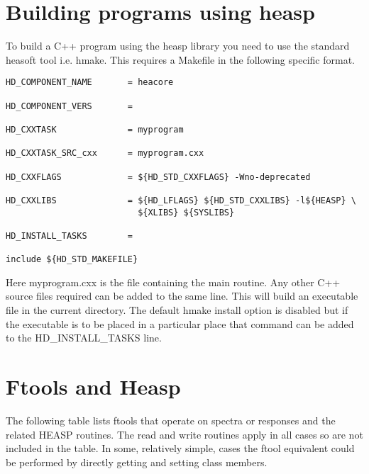 \documentclass[11pt]{book}
\begin{document}
\appendix


\chapter{Building programs using heasp}

To build a C++ program using the heasp library you need to use the
standard heasoft tool i.e. hmake. This requires a Makefile in the
following specific format.

\begin{verbatim}
HD_COMPONENT_NAME       = heacore

HD_COMPONENT_VERS       =

HD_CXXTASK              = myprogram

HD_CXXTASK_SRC_cxx      = myprogram.cxx

HD_CXXFLAGS             = ${HD_STD_CXXFLAGS} -Wno-deprecated

HD_CXXLIBS              = ${HD_LFLAGS} ${HD_STD_CXXLIBS} -l${HEASP} \
                          ${XLIBS} ${SYSLIBS}

HD_INSTALL_TASKS        = 

include ${HD_STD_MAKEFILE}
\end{verbatim}

Here myprogram.cxx is the file containing the main routine. Any other
C++ source files required can be added to the same line. This will
build an executable file in the current directory. The default hmake install
option is disabled but if the executable is to be placed in a
particular place that command can be added to the HD\_INSTALL\_TASKS
line.



\chapter{Ftools and Heasp}

The following table lists ftools that operate on spectra or responses
and the related HEASP routines. The read and write routines apply in
all cases so are not included in the table. In some, relatively
simple, cases the ftool equivalent could be performed by directly
getting and setting class members. 
\end{document}
